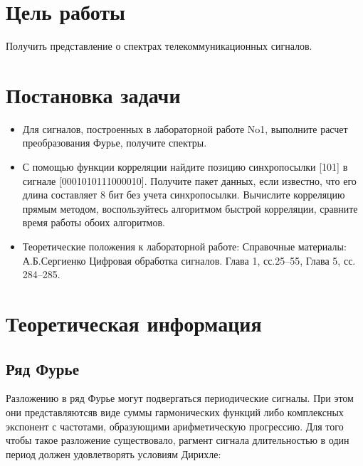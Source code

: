







\section{Цель работы}
Получить представление о спектрах телекоммуникационных
сигналов.

\section{Постановка задачи}

\begin{itemize}

\item Для сигналов, построенных в лабораторной работе No1, выполните расчет преобразования Фурье, получите спектры.
\item  С помощью функции корреляции найдите позицию синхропосылки [101] в сигнале [0001010111000010]. Получите пакет
данных, если известно, что его длина составляет 8 бит без
учета синхропосылки. Вычислите корреляцию прямым методом, воспользуйтесь алгоритмом быстрой корреляции, сравните время работы обоих алгоритмов.
\item Теоретические положения к лабораторной работе: Справочные материалы: А.Б.Сергиенко Цифровая обработка сигналов. Глава 1,  сс.25–55, Глава 5, сс. 284–285.

\end{itemize}



\section{Теоретическая информация}
\subsection{Ряд Фурье}
Разложению в ряд Фурье могут подвергаться периодические сигналы. При этом они представляютсяв виде суммы гармонических функций либо комплексных экспонент с частотами, образующими арифметическую прогрессию. Для того чтобы такое разложение существовало, рагмент сигнала длительностью в один период должен удовлетворять условиям Дирихле:

